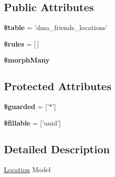 \subsection*{Public Attributes}
\begin{DoxyCompactItemize}
\item 
\hypertarget{classDMA_1_1Friends_1_1Models_1_1Location_ac1f41b316e50581d95f80655e36b7f9d}{{\bfseries \$table} = 'dma\+\_\+friends\+\_\+locations'}\label{classDMA_1_1Friends_1_1Models_1_1Location_ac1f41b316e50581d95f80655e36b7f9d}

\item 
\hypertarget{classDMA_1_1Friends_1_1Models_1_1Location_a3df0019a82eb74c240408878329baa2c}{{\bfseries \$rules} = \mbox{[}$\,$\mbox{]}}\label{classDMA_1_1Friends_1_1Models_1_1Location_a3df0019a82eb74c240408878329baa2c}

\item 
{\bfseries \$morph\+Many}
\end{DoxyCompactItemize}
\subsection*{Protected Attributes}
\begin{DoxyCompactItemize}
\item 
\hypertarget{classDMA_1_1Friends_1_1Models_1_1Location_a248021f938f61b3ccce7e20b259e39e9}{{\bfseries \$guarded} = \mbox{[}'$\ast$'\mbox{]}}\label{classDMA_1_1Friends_1_1Models_1_1Location_a248021f938f61b3ccce7e20b259e39e9}

\item 
\hypertarget{classDMA_1_1Friends_1_1Models_1_1Location_aaa75ba74c2a24c4e42b109b0b2c82ca0}{{\bfseries \$fillable} = \mbox{[}'uuid'\mbox{]}}\label{classDMA_1_1Friends_1_1Models_1_1Location_aaa75ba74c2a24c4e42b109b0b2c82ca0}

\end{DoxyCompactItemize}


\subsection{Detailed Description}
\hyperlink{classDMA_1_1Friends_1_1Models_1_1Location}{Location} Model 

